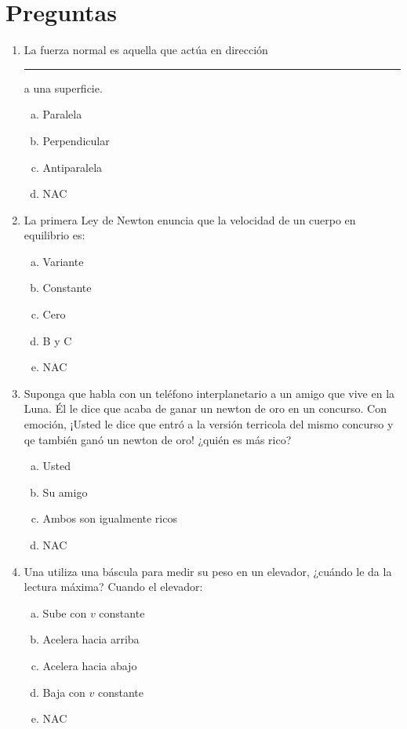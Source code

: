 \section*{Preguntas}
\begin{multicols}{2}
\begin{enumerate}
	
	\item La fuerza normal es aquella que actúa en dirección \rule{3cm}{0.5pt} a una superficie.
	\begin{enumerate}[a)]
		\item Paralela
		\item \colorbox[rgb]{1,1,0}{Perpendicular}
		\item Antiparalela
		\item NAC
	\end{enumerate}
	
	
	
	\item La primera Ley de Newton enuncia que la velocidad de un cuerpo en equilibrio es:
	\begin{enumerate}[a)]
		\item Variante
		\item Constante
		\item Cero
		\item \colorbox[rgb]{1,1,0}{B y C}
		\item NAC
	\end{enumerate}
	
	
	
	\item Suponga que habla con un teléfono interplanetario a un amigo que vive en la Luna. Él le dice que acaba de ganar un newton de oro en un concurso. Con emoción, ¡Usted le dice que entró a la versión terricola del mismo concurso y qe también ganó un newton de oro! ¿quién es más rico?
	\begin{enumerate}[a)]
		\item Usted
		\item \colorbox[rgb]{1,1,0}{Su amigo}
		\item Ambos son igualmente ricos
		\item NAC
	\end{enumerate}
	
	\columnbreak
	
	\item Una utiliza una báscula para medir su peso en un elevador, ¿cuándo le da la lectura máxima? Cuando el elevador: 
	\begin{enumerate}[a)]
		\item Sube con $v$ constante
		\item \colorbox[rgb]{1,1,0}{Acelera hacia arriba}
		\item Acelera hacia abajo
		\item Baja con $v$ constante
		\item NAC
	\end{enumerate}
	

\end{enumerate}
\end{multicols}
